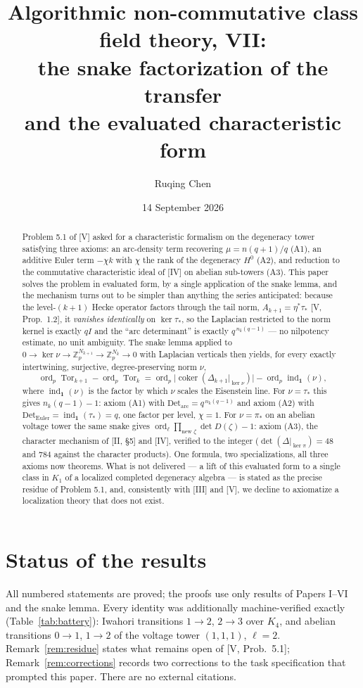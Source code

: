 \documentclass[11pt]{amsart}
\title[Algorithmic non-commutative class field theory, VII]
{Algorithmic non-commutative class field theory, VII:\\
the snake factorization of the transfer\\ and the evaluated characteristic form}
\author{Ruqing Chen}
\date{14 September 2026}
\numberwithin{equation}{section}
\theoremstyle{definition}
\theoremstyle{remark}
\newcommand{\Z}{\mathbb{Z}}
\newcommand{\Zp}{\Z_p}
\newcommand{\Tor}{\operatorname{Tor}}
\newcommand{\coker}{\operatorname{coker}}
\newcommand{\ord}{\operatorname{ord}}
\newcommand{\ind}{\operatorname{ind}_{\mathbf1}}
\newcommand{\ta}{\tau_*}
\newcommand{\etp}{\eta^*}
\begin{document}
\begin{abstract}
Problem 5.1 of [V] asked for a characteristic formalism on the degeneracy tower
satisfying three axioms: an arc-density term recovering $\mu=n(q+1)/q$ (A1), an
additive Euler term $-\chi k$ with $\chi$ the rank of the degeneracy $H^0$ (A2), and
reduction to the commutative characteristic ideal of [IV] on abelian sub-towers
(A3). This paper solves the problem in evaluated form, by a single application of
the snake lemma, and the mechanism turns out to be simpler than anything the series
anticipated: because the level-$(k{+}1)$ Hecke operator factors through the tail
norm, $A_{k+1}=\etp\ta$ {\rm[V, Prop.~1.2]}, it \emph{vanishes identically} on
$\ker\ta$, so the Laplacian restricted to the norm kernel is exactly $qI$ and the
``arc determinant'' is exactly $q^{\,n_k(q-1)}$ --- no nilpotency estimate, no unit
ambiguity. The snake lemma applied to
$0\to\ker\nu\to\Zp^{N_{k+1}}\to\Zp^{N_k}\to0$ with Laplacian verticals then yields,
for every exactly intertwining, surjective, degree-preserving norm $\nu$,
\[
\ord_p\Tor_{k+1}-\ord_p\Tor_k
=\ord_p\bigl|\coker(\Delta_{k+1}|_{\ker\nu})\bigr|-\ord_p\ind(\nu),
\]
where $\ind(\nu)$ is the factor by which $\nu$ scales the Eisenstein line. For
$\nu=\ta$ this gives $n_k(q-1)-1$: axiom (A1) with $\mathrm{Det_{arc}}
=q^{\,n_k(q-1)}$ and axiom (A2) with $\mathrm{Det_{Euler}}=\ind(\ta)=q$, one factor
per level, $\chi=1$. For $\nu=\pi_*$ on an abelian voltage tower the same snake
gives $\ord_\ell\prod_{\text{new }\zeta}\det D(\zeta)-1$: axiom (A3), the character
mechanism of [II, \S5] and [IV], verified to the integer
($\det(\Delta|_{\ker\pi})=48$ and $784$ against the character products). One
formula, two specializations, all three axioms now theorems. What is not delivered
--- a lift of this evaluated form to a single class in $K_1$ of a localized
completed degeneracy algebra --- is stated as the precise residue of Problem 5.1,
and, consistently with [III] and [V], we decline to axiomatize a localization theory
that does not exist.
\end{abstract}

\maketitle

\section*{Status of the results}

All numbered statements are proved; the proofs use only results of Papers I--VI and
the snake lemma. Every identity was additionally machine-verified exactly
(Table~\ref{tab:battery}): Iwahori transitions $1\to2$, $2\to3$ over $K_4$, and
abelian transitions $0\to1$, $1\to2$ of the voltage tower $(1,1,1)$, $\ell=2$.
Remark~\ref{rem:residue} states what remains open of [V, Prob.~5.1];
Remark~\ref{rem:corrections} records two corrections to the task specification that
prompted this paper. There are no external citations.
\end{document}
